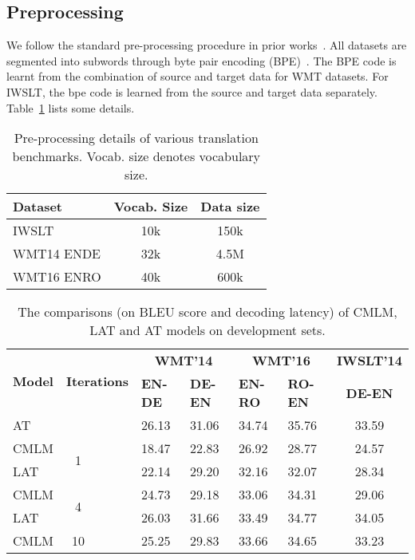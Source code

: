\documentclass[11pt,a4paper]{article}
\begin{document}
\newcommand{\minus}{\scalebox{0.75}[1.0]{}}
\renewcommand{\thesubsection}{\Alph{subsection}}

\subsection{Preprocessing}
We follow the standard pre-processing procedure in prior works~\cite{vaswani2017attention,lee2018deterministic}. All datasets are segmented into subwords through byte pair encoding (BPE)~\cite{sennrich2016neural}. The BPE code is learnt from the combination of source and target data for WMT datasets. For IWSLT, the bpe code is learned from the source and target data separately. Table~\ref{tab:data-pre} lists some details.
\begin{table}[!ht]
    \centering
    \begin{tabular}{lcc}
        \toprule
        Dataset &  Vocab. Size & Data size\\
        \midrule
        IWSLT & 10k & 150k\\
        WMT14 ENDE & 32k & 4.5M\\
        WMT16 ENRO & 40k & 600k\\
        \bottomrule
    \end{tabular}
    \caption{Pre-processing details of various translation benchmarks. Vocab. size denotes vocabulary size.}
    \label{tab:data-pre}
\end{table}


\begin{table*}[th!]
\centering
\small
\begin{tabular}{lcllllc}
\toprule
\multirow{2}{*}{\textbf{Model}} & \multirow{2}{*}{\textbf{Iterations}} & \multicolumn{2}{c}{\textbf{WMT'14}} & \multicolumn{2}{c}{\textbf{WMT'16}} & \textbf{IWSLT'14}\\
  & &\textbf{EN-DE} & \textbf{DE-EN} & \textbf{EN-RO} & \textbf{RO-EN} & \textbf{DE-EN}\\
 \midrule
AT &  ~~~~~~ & 26.13 & 31.06 & 34.74 & 35.76 & 33.59\\
\midrule
CMLM  & \multirow{2}{*}{1~~~~~~} & 18.47 & 22.83 & 26.92 & 28.77 & 24.57\\
LAT &   &22.14 & 29.20 & 32.16 & 32.07 & 28.34\\
\midrule
CMLM
& \multirow{2}{*}{4~~~~~~} & 24.73& 29.18 & 33.06 & 34.31 & 29.06\\
LAT & & 26.03 & 31.66 & 33.49 & 34.77& 34.05 \\
\midrule
CMLM
 & 10~~~~~~ & 25.25& 29.83 & 33.66 & 34.65 & 33.23\\
\bottomrule
\end{tabular}
\caption{The comparisons (on BLEU score and decoding latency) of CMLM, LAT and AT models on development sets.
}
\label{tab:main-rst-dev}
\end{table*}
\end{document}
